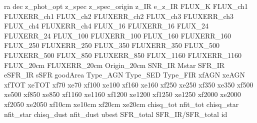 ra
dec
z_phot_opt
z_spec
z_spec_origin
z_IR
e_z_IR
FLUX_K
FLUX_ch1
FLUXERR_ch1
FLUX_ch2
FLUXERR_ch2
FLUX_ch3
FLUXERR_ch3
FLUX_ch4
FLUXERR_ch4
FLUX_16
FLUXERR_16
FLUX_24
FLUXERR_24
FLUX_100
FLUXERR_100
FLUX_160
FLUXERR_160
FLUX_250
FLUXERR_250
FLUX_350
FLUXERR_350
FLUX_500
FLUXERR_500
FLUX_850
FLUXERR_850
FLUX_1160
FLUXERR_1160
FLUX_20cm
FLUXERR_20cm
Origin_20cm
SNR_IR
Mstar
SFR_IR
eSFR_IR
sSFR
goodArea
Type_AGN
Type_SED
Type_FIR
xfAGN
xeAGN
xfTOT
xeTOT
xf70
xe70
xf100
xe100
xf160
xe160
xf250
xe250
xf350
xe350
xf500
xe500
xf850
xe850
xf1160
xe1160
xf1200
xe1200
xf1250
xe1250
xf2000
xe2000
xf2050
xe2050
xf10cm
xe10cm
xf20cm
xe20cm
chisq_tot
nfit_tot
chisq_star
nfit_star
chisq_dust
nfit_dust
ubest
SFR_total
SFR_IR/SFR_total
id